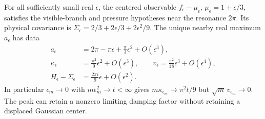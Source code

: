 \begin{proposition}
\label{prop:v58-baker-realization}
For all sufficiently small real $\epsilon$, the centered observable
$f_\epsilon-\mu_\epsilon$, $\mu_\epsilon=1+\epsilon/3$, satisfies
the visible-branch and pressure hypotheses near the resonance $2\pi$.
Its physical covariance is
$\Sigma_\epsilon=2/3+2\epsilon/3+2\epsilon^2/9$.
The unique nearby real maximum $a_\epsilon$ has data
\begin{align}
 a_\epsilon&=2\pi-\pi\epsilon+\tfrac\pi3\epsilon^2+O(\epsilon^3),
                                      \label{eq:v58-baker-maximum}\\
 \kappa_\epsilon&=\tfrac{\pi^2}{9}\epsilon^2+O(\epsilon^3),\qquad
 v_\epsilon=\tfrac{\pi^2}{18}\epsilon^3+O(\epsilon^4),
                                      \label{eq:v58-baker-drift}\\
 H_\epsilon-\Sigma_\epsilon
             &=\tfrac{2\pi i}{9}\epsilon+O(\epsilon^2).
                                      \label{eq:v58-baker-hessian}
\end{align}
In particular $\epsilon_m\to0$ with $m\epsilon_m^2\to t<\infty$
gives $m\kappa_{\epsilon_m}\to\pi^2t/9$ but
$\sqrt m\,v_{\epsilon_m}\to0$. The peak can retain a nonzero
limiting damping factor without retaining a displaced Gaussian center.
\end{proposition}
